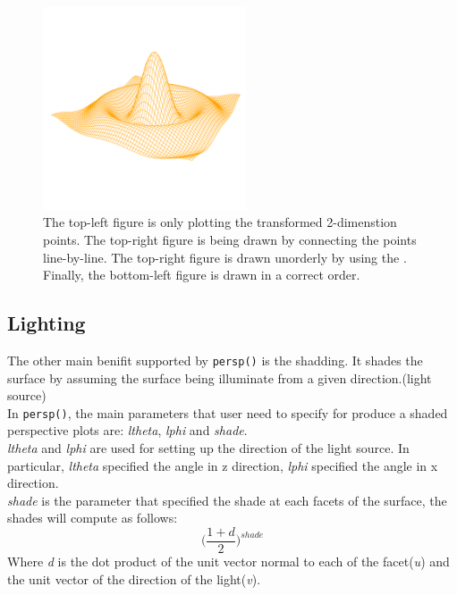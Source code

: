 \documentclass[paper=a4, fontsize=11pt]{report}
\begin{document}
\begin{figure}[h]
\begin{center}
  \includegraphics[height = 6cm, width = 6cm]{figure/standalone_p_4.pdf}
  \caption{The top-left figure is only plotting the transformed 2-dimenstion points. The top-right figure is being drawn by connecting the points line-by-line. The top-right figure is drawn unorderly by using the . Finally, the bottom-left figure is drawn in a correct order.}
  	\label{figure4}
\end{center}
\end{figure}

\subsection{Lighting}
The other main benifit supported by \texttt{persp()} is the shadding. It shades the surface by assuming the surface being illuminate from a given direction.(light source)\\

In \texttt{persp()}, the main parameters that user need to specify for produce a shaded perspective plots are: \textit{ltheta}, \textit{lphi} and \textit{shade}.\\

\textit{ltheta} and \textit{lphi} are used for setting up the direction of the light source. In particular, \textit{ltheta} specified the angle in z direction, \textit{lphi} specified the angle in x direction. \\

\textit{shade} is the parameter that specified the shade at each facets of the surface, the shades will compute as follows:
\begin{equation}
\big(\frac{1 + d}{2}\big)^{shade}
\end{equation}
Where \textit{d} is the dot product of the unit vector normal to each of the facet(\textit{u}) and the unit vector of the direction of the light(\textit{v}). \\
\end{document}
